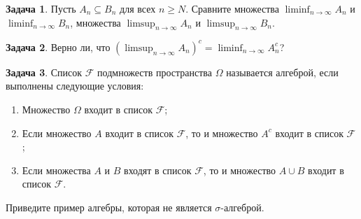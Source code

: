 \documentclass[pdftex, 12pt, a4paper]{article}
\def\F{\ensuremath{\mathcal{F}}} %
\def\s{\ensuremath{\sigma}}
\def \Om{\Omega}
\renewcommand{\to}{\rightarrow}
\renewcommand{\ge}{\geqslant}
\theoremstyle{definition} %
\newtheorem{problem}{Задача}
\numberwithin{problem}{section}
\numberwithin{blits}{section}
\begin{document}
\begin{problem}
Пусть $A_n \subseteq B_n$ для всех $n \ge N$. Сравните множества $\liminf_{n \to \infty} A_n$ и $\liminf_{n \to \infty} B_n$, множества  $\limsup_{n \to \infty} A_n$ и $\limsup_{n \to \infty} B_n$.
\begin{sol}

\end{sol}
\end{problem}

\begin{problem}
Верно ли, что $(\limsup_{n \to \infty} A_n)^{c} = \liminf_{n \to \infty} A_n^c$?
\begin{sol}

\end{sol}
\end{problem}

\begin{problem}

Список $\F$ подмножеств пространства $\Om$ называется алгеброй, если выполнены следующие условия:

\begin{enumerate}
\item Множество $\Om$ входит в список $\F$;

\item Если множество $A$ входит в список $\F$, то и множество $A^c$ входит в список $\F$;

\item Если множества $A$ и $B$ входят в список $\F$, то и множество $A \cup B$ входит в список $\F$. 
\end{enumerate}

Приведите пример алгебры, которая не является \s-алгеброй.
\begin{sol}


\end{sol}
\end{problem}




\printbibliography
\end{document}
